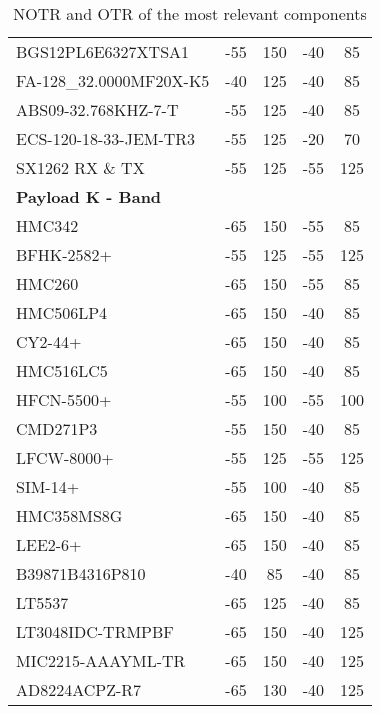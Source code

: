 \begin{table}[H]
\begin{tabular}{lcccc}
  BGS12PL6E6327XTSA1  & -55          & 150          & -40          & 85           \\ 
  FA-128\_32.0000MF20X-K5 & -40       & 125          & -40          & 85           \\ 
  ABS09-32.768KHZ-7-T & -55          & 125          & -40          & 85           \\ 
  ECS-120-18-33-JEM-TR3 & -55        & 125          & -20          & 70           \\ 
  SX1262 RX \& TX     & -55          & 125          & -55          & 125          \\ 
  \midrule
  \textbf{Payload K - Band} & & & & \\
  \midrule
  HMC342             & -65          & 150          & -55          & 85           \\ 
  BFHK-2582+         & -55          & 125          & -55          & 125          \\ 
  HMC260             & -65          & 150          & -55          & 85           \\ 
  HMC506LP4          & -65          & 150          & -40          & 85           \\ 
  CY2-44+            & -65          & 150          & -40          & 85           \\ 
  HMC516LC5          & -65          & 150          & -40          & 85           \\ 
  HFCN-5500+         & -55          & 100          & -55          & 100          \\ 
  CMD271P3           & -55          & 150          & -40          & 85           \\ 
  LFCW-8000+         & -55          & 125          & -55          & 125          \\ 
  SIM-14+            & -55          & 100          & -40          & 85           \\ 
  HMC358MS8G         & -65          & 150          & -40          & 85           \\ 
  LEE2-6+            & -65          & 150          & -40          & 85           \\ 
  B39871B4316P810    & -40          & 85           & -40          & 85           \\ 
  LT5537             & -65          & 125          & -40          & 85           \\ 
  LT3048IDC-TRMPBF   & -65          & 150          & -40          & 125          \\ 
  MIC2215-AAAYML-TR  & -65          & 150          & -40          & 125          \\ 
  AD8224ACPZ-R7      & -65          & 130          & -40          & 125          \\ 
  \bottomrule
  \end{tabular}
  \caption{NOTR and OTR of the most relevant components}
  \label{tab:table_3_10_2.1}
\end{table}

